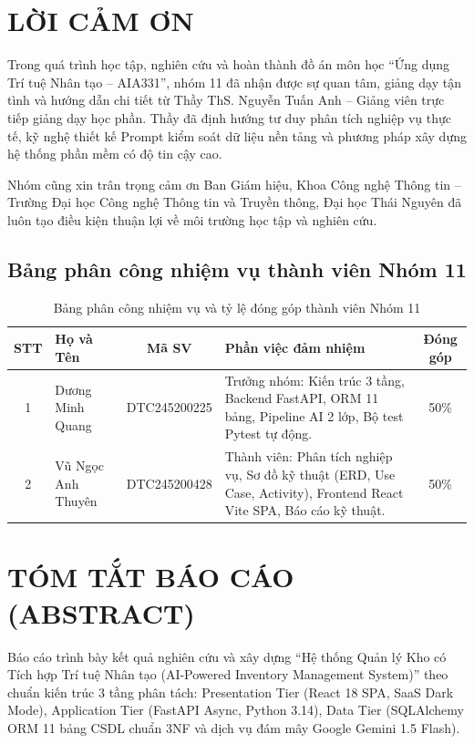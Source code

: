 \documentclass[12pt,a4paper,oneside]{report}
\begin{document}

\chapter*{LỜI CẢM ƠN}
Trong quá trình học tập, nghiên cứu và hoàn thành đồ án môn học ``Ứng dụng Trí tuệ Nhân tạo – AIA331'', nhóm 11 đã nhận được sự quan tâm, giảng dạy tận tình và hướng dẫn chi tiết từ Thầy ThS. Nguyễn Tuấn Anh – Giảng viên trực tiếp giảng dạy học phần. Thầy đã định hướng tư duy phân tích nghiệp vụ thực tế, kỹ nghệ thiết kế Prompt kiểm soát dữ liệu nền tảng và phương pháp xây dựng hệ thống phần mềm có độ tin cậy cao.

Nhóm cũng xin trân trọng cảm ơn Ban Giám hiệu, Khoa Công nghệ Thông tin – Trường Đại học Công nghệ Thông tin và Truyền thông, Đại học Thái Nguyên đã luôn tạo điều kiện thuận lợi về môi trường học tập và nghiên cứu.

\section*{Bảng phân công nhiệm vụ thành viên Nhóm 11}
\begin{table}[htbp]
\centering
\begin{tabularx}{\textwidth}{|c|X|c|X|c|}
\hline
\textbf{STT} & \textbf{Họ và Tên} & \textbf{Mã SV} & \textbf{Phần việc đảm nhiệm} & \textbf{Đóng góp} \\
\hline
1 & Dương Minh Quang & DTC245200225 & Trưởng nhóm: Kiến trúc 3 tầng, Backend FastAPI, ORM 11 bảng, Pipeline AI 2 lớp, Bộ test Pytest tự động. & 50\% \\
\hline
2 & Vũ Ngọc Anh Thuyên & DTC245200428 & Thành viên: Phân tích nghiệp vụ, Sơ đồ kỹ thuật (ERD, Use Case, Activity), Frontend React Vite SPA, Báo cáo kỹ thuật. & 50\% \\
\hline
\end{tabularx}
\caption{Bảng phân công nhiệm vụ và tỷ lệ đóng góp thành viên Nhóm 11}
\label{tab:mem}
\end{table}

\newpage

\chapter*{TÓM TẮT BÁO CÁO (ABSTRACT)}
Báo cáo trình bày kết quả nghiên cứu và xây dựng ``Hệ thống Quản lý Kho có Tích hợp Trí tuệ Nhân tạo (AI-Powered Inventory Management System)'' theo chuẩn kiến trúc 3 tầng phân tách: Presentation Tier (React 18 SPA, SaaS Dark Mode), Application Tier (FastAPI Async, Python 3.14), Data Tier (SQLAlchemy ORM 11 bảng CSDL chuẩn 3NF và dịch vụ đám mây Google Gemini 1.5 Flash).
\end{document}

